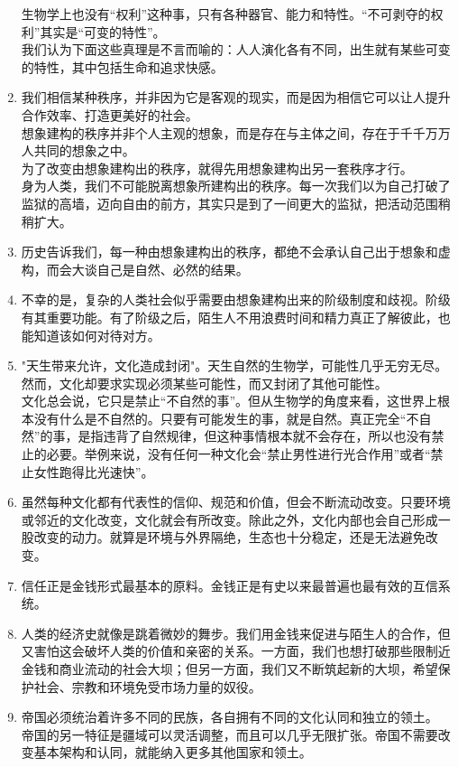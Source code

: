 \documentclass[UTF8]{ctexart}
\begin{document}
\begin{enumerate}
			生物学上也没有“权利”这种事，只有各种器官、能力和特性。“不可剥夺的权利”其实是“可变的特性”。\\
			我们认为下面这些真理是不言而喻的：人人演化各有不同，出生就有某些可变的特性，其中包括生命和追求快感。
			\item 我们相信某种秩序，并非因为它是客观的现实，而是因为相信它可以让人提升合作效率、打造更美好的社会。\\
			想象建构的秩序并非个人主观的想象，而是存在与主体之间，存在于千千万万人共同的想象之中。\\
			为了改变由想象建构出的秩序，就得先用想象建构出另一套秩序才行。\\
			身为人类，我们不可能脱离想象所建构出的秩序。每一次我们以为自己打破了监狱的高墙，迈向自由的前方，其实只是到了一间更大的监狱，把活动范围稍稍扩大。
			\item 历史告诉我们，每一种由想象建构出的秩序，都绝不会承认自己出于想象和虚构，而会大谈自己是自然、必然的结果。
			\item 不幸的是，复杂的人类社会似乎需要由想象建构出来的阶级制度和歧视。阶级有其重要功能。有了阶级之后，陌生人不用浪费时间和精力真正了解彼此，也能知道该如何对待对方。
			\item "天生带来允许，文化造成封闭"。天生自然的生物学，可能性几乎无穷无尽。然而，文化却要求实现必须某些可能性，而又封闭了其他可能性。\\
			文化总会说，它只是禁止“不自然的事”。但从生物学的角度来看，这世界上根本没有什么是不自然的。只要有可能发生的事，就是自然。真正完全“不自然”的事，是指违背了自然规律，但这种事情根本就不会存在，所以也没有禁止的必要。举例来说，没有任何一种文化会“禁止男性进行光合作用”或者“禁止女性跑得比光速快”。
			\item 虽然每种文化都有代表性的信仰、规范和价值，但会不断流动改变。只要环境或邻近的文化改变，文化就会有所改变。除此之外，文化内部也会自己形成一股改变的动力。就算是环境与外界隔绝，生态也十分稳定，还是无法避免改变。
			\item 信任正是金钱形式最基本的原料。金钱正是有史以来最普遍也最有效的互信系统。
			\item 人类的经济史就像是跳着微妙的舞步。我们用金钱来促进与陌生人的合作，但又害怕这会破坏人类的价值和亲密的关系。一方面，我们也想打破那些限制近金钱和商业流动的社会大坝；但另一方面，我们又不断筑起新的大坝，希望保护社会、宗教和环境免受市场力量的奴役。
			\item 帝国必须统治着许多不同的民族，各自拥有不同的文化认同和独立的领土。\\
			帝国的另一特征是疆域可以灵活调整，而且可以几乎无限扩张。帝国不需要改变基本架构和认同，就能纳入更多其他国家和领土。\\

\end{enumerate}
\end{document}
